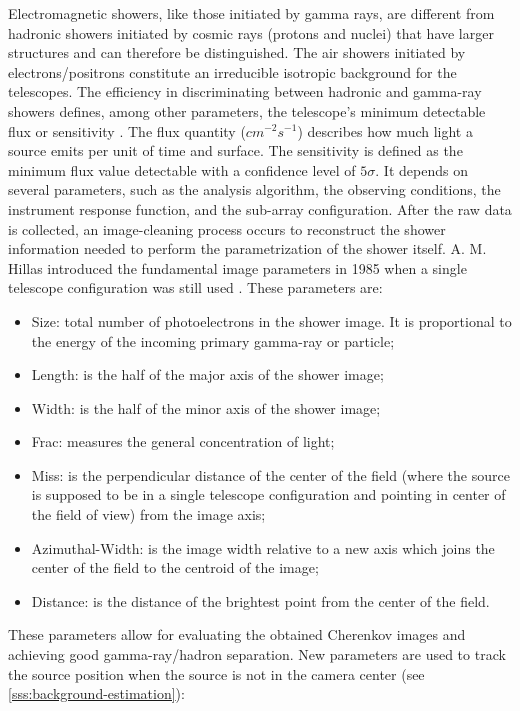 Electromagnetic showers, like those initiated by gamma rays, are different from hadronic showers initiated by cosmic rays (protons and nuclei) that have larger structures and can therefore be distinguished. The air showers initiated by electrons/positrons constitute an irreducible isotropic background for the telescopes. The efficiency in discriminating between hadronic and gamma-ray showers defines, among other parameters, the telescope's minimum detectable flux or sensitivity \cite{tampieri2020real}. 
The flux quantity ($cm^{-2} s^{-1}$) describes how much light a source emits per unit of time and surface. The sensitivity is defined as the minimum flux value detectable with a confidence level of $5\sigma$. It depends on several parameters, such as the analysis algorithm, the observing conditions, the instrument response function, and the sub-array configuration. After the raw data is collected, an image-cleaning process occurs to reconstruct the shower information needed to perform the parametrization of the shower itself. A. M. Hillas introduced the fundamental image parameters in 1985 when a single telescope configuration was still used \cite{hillas1985cerenkov}. These parameters are:
\begin{itemize}
    \item Size: total number of photoelectrons in the shower image. It is proportional to the energy of the incoming primary gamma-ray or particle;
    \item Length: is the half of the major axis of the shower image;
    \item Width: is the half of the minor axis of the shower image;
    \item Frac: measures the general concentration of light;
    \item Miss: is the perpendicular distance of the center of the field (where the source is supposed to be in a single telescope configuration and pointing in center of the field of view) from the image axis;
    \item Azimuthal-Width: is the image width relative to a new axis which
joins the center of the field to the centroid of the image; 
    \item Distance: is the distance of the brightest point from the center of the
field.
\end{itemize}
These parameters allow for evaluating the obtained Cherenkov images and achieving good gamma-ray/hadron separation. 
New parameters are used to track the source position when the source is not in the camera center (see \autoref{sss:background-estimation}):
